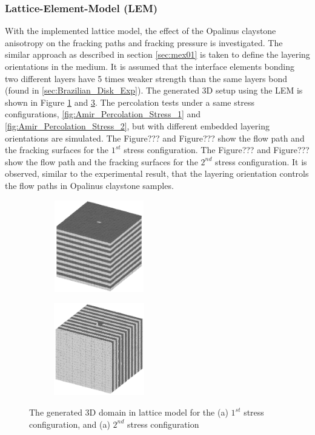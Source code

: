 \subsubsection*{Lattice-Element-Model (LEM)}

With the implemented lattice model, the effect of the Opalinus claystone anisotropy on the fracking paths and fracking pressure is investigated. The similar approach as described in section \ref {sec:mex01} is taken to define the layering orientations in the medium. It is assumed that the interface elements bonding two different layers have 5 times weaker strength than the same layers bond (found in \ref{sec:Brazilian_Disk_Exp}). The generated 3D setup using the LEM is shown in Figure \ref{fig:Amir_Percolation_Setup_a} and \ref{fig:Amir_Percolation_Setup_b}. The percolation tests under a same stress configurations, \ref{fig:Amir_Percolation_Stress_1} and \ref{fig:Amir_Percolation_Stress_2}, but with different embedded layering orientations are simulated. The Figure??? and Figure??? show the flow path and the fracking surfaces for the $1^{st}$ stress configuration. The Figure??? and Figure??? show the flow path and the fracking surfaces for the $2^{nd}$ stress configuration. It is observed, similar to the experimental result, that the layering orientation controls the flow paths in Opalinus claystone samples.


\begin{figure}[!ht]
\begin{subfigure}[c]{0.48\textwidth}
\centering
\includegraphics[width=4cm,height=4cm]{figures/Amir_Percolation_Setup_a.png}
\subcaption{}
\label{fig:Amir_Percolation_Setup_a}
\end{subfigure}
\hfill
\begin{subfigure}[c]{0.48\textwidth}
\centering
\includegraphics[width=4cm,height=4cm]{figures/Amir_Percolation_Setup_b.png}
\subcaption{}
\label{fig:Amir_Percolation_Setup_b}
\end{subfigure}
\caption{The generated 3D domain in lattice model for the (a) $1^{st}$ stress configuration, and (a) $2^{nd}$ stress configuration}
\end{figure}




